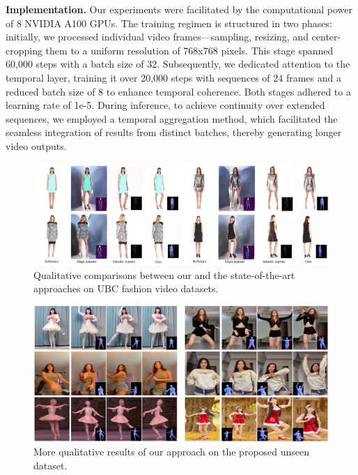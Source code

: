 \textbf{Implementation.} 
Our experiments were facilitated by the computational power of 8 NVIDIA A100 GPUs. 
The training regimen is structured in two phases: initially, we processed individual video frames—sampling, resizing, and center-cropping them to a uniform resolution of 768x768 pixels. 
This stage spanned 60,000 steps with a batch size of 32. Subsequently, we dedicated attention to the temporal layer, training it over 20,000 steps with sequences of 24 frames and a reduced batch size of 8 to enhance temporal coherence. Both stages adhered to a learning rate of 1e-5.
During inference, to achieve continuity over extended sequences, we employed a temporal aggregation method, which facilitated the seamless integration of results from distinct batches, thereby generating longer video outputs. 

\begin{figure}[!t]
  \centering
  \includegraphics[width=\textwidth]{fig/fig_comp_ubc.png}
  \caption[]{Qualitative comparisons between our and the state-of-the-art approaches on UBC fashion video datasets.}
  \label{fig:ubc_data}
\end{figure}

\begin{figure}[!t]
  \centering
  \includegraphics[width=\textwidth]{fig/fig_wild_results.png}
  \caption[]{More qualitative results of our approach on the proposed unseen dataset.}
  \vspace{-4mm}
  \label{fig:wild_data}
\end{figure}

